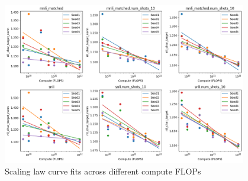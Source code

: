 \begin{table}
\centering
{}
\caption{Monotonicity values for the 8B and 70B models during the course of the training. We report both the discrete ($mon_{disc}$) and continuous ($mon_{cont}$) monotonicity values.}
\label{tab:monotonicity}
\end{table}


\begin{figure}[ht]
    \centering
    \includegraphics[width=0.95\textwidth]{nli_plots/sl_fits_mnli_snli.png}
    \caption{Scaling law curve fits across different compute FLOPs}
    \label{fig:sl_mnli_snli}
\end{figure}

